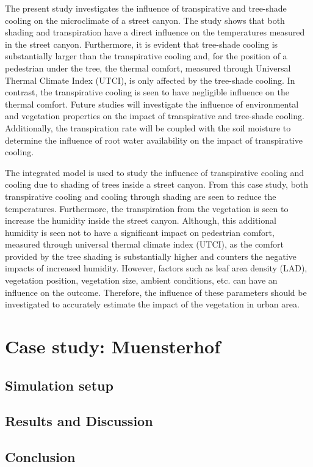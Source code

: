 The present study investigates the influence of transpirative and tree-shade cooling on the microclimate of a street canyon. The study shows that both shading and transpiration have a direct influence on the temperatures measured in the street canyon. Furthermore, it is evident that tree-shade cooling is substantially larger than the transpirative cooling and, for the position of a pedestrian under the tree, the thermal comfort, measured through Universal Thermal Climate Index (UTCI), is only affected by the tree-shade cooling. In contrast, the transpirative cooling is seen to have negligible influence on the thermal comfort. Future studies will investigate the influence of environmental and vegetation properties on the impact of transpirative and tree-shade cooling. Additionally, the transpiration rate will be coupled with the soil moisture to determine the influence of root water availability on the impact of transpirative cooling.

The integrated model is used to study the influence of transpirative cooling and cooling due to shading of trees inside a street canyon. From this case study, both transpirative cooling and cooling through shading are seen to reduce the temperatures. Furthermore, the transpiration from the vegetation is seen to increase the humidity inside the street canyon. Although, this additional humidity is seen not to have a significant impact on pedestrian comfort, measured through universal thermal climate index (UTCI), as the comfort provided by the tree shading is substantially higher and counters the negative impacts of increased humidity. However, factors such as leaf area density (LAD), vegetation position, vegetation size, ambient conditions, etc. can have an influence on the outcome. Therefore, the influence of these parameters should be investigated to accurately estimate the impact of the vegetation in urban area.  

\section{Case study: Muensterhof}

\subsection{Simulation setup}

\subsection{Results and Discussion}

\subsection{Conclusion}
